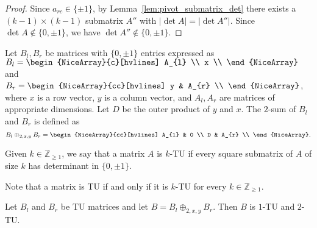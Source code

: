 \begin{proof}
    Since $a_{rc} \in \{\pm 1\}$, by Lemma~\ref{lem:pivot_submatrix_det} there exists a $(k - 1) \times (k - 1)$ submatrix $A''$ with $|\det A| = |\det A''|$. Since $\det A \notin \{0, \pm 1\}$, we have $\det A'' \notin \{0, \pm 1\}$.
\end{proof}

\begin{definition}\label{def:two_sum}
    Let $B_{l}, B_{r}$ be matrices with $\{0, \pm 1\}$ entries expressed as $B_{l} = \begin{NiceArray}{c}[hvlines] A_{l} \\ x \\ \end{NiceArray}$ and $B_{r} = \begin{NiceArray}{cc}[hvlines] y & A_{r} \\ \end{NiceArray}$, where $x$ is a row vector, $y$ is a column vector, and $A_{l}, A_{r}$ are matrices of appropriate dimensions. Let $D$ be the outer product of $y$ and $x$. The $2$-sum of $B_{l}$ and $B_{r}$ is defined as
    \[
        B_{l} \oplus_{2, x, y} B_{r} = \begin{NiceArray}{cc}[hvlines] A_{l} & 0 \\ D & A_{r} \\ \end{NiceArray}.
    \]
\end{definition}

\begin{definition}\label{def:k_tu}
    Given $k \in \mathbb{Z}_{\geq 1}$, we say that a matrix $A$ is $k$-TU if every square submatrix of $A$ of size $k$ has determinant in $\{0, \pm 1\}$.
\end{definition}

\begin{remark}
    Note that a matrix is TU if and only if it is $k$-TU for every $k \in \mathbb{Z}_{\geq 1}$.
\end{remark}

\begin{lemma}\label{lem:two_sum_1_2_tu}
    Let $B_{l}$ and $B_{r}$ be TU matrices and let $B = B_{l} \oplus_{2, x, y} B_{r}$. Then $B$ is $1$-TU and $2$-TU.
\end{lemma}

